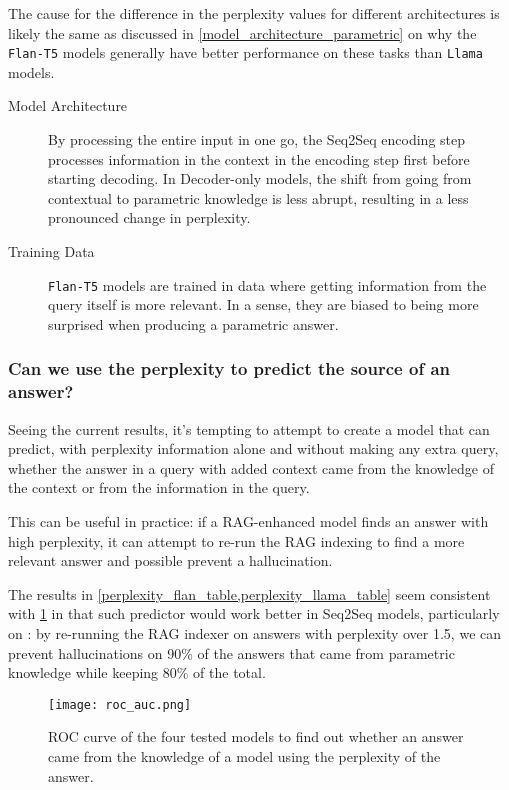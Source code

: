 The cause for the difference in the perplexity values for different architectures is likely the same as discussed in \cref{model_architecture_parametric} on why the \texttt{Flan-T5} models generally have better performance on these tasks than \texttt{Llama} models.
\begin{description}
	\item[Model Architecture] By processing the entire input in one go, the Seq2Seq encoding step processes information in the context in the encoding step first before starting decoding. In Decoder-only models, the shift from going from contextual to parametric knowledge is less abrupt, resulting in a less pronounced change in perplexity.
	\item[Training Data] \texttt{Flan-T5} models are trained in data where getting information from the query itself is more relevant.
		In a sense, they are biased to being more surprised when producing a parametric answer.
\end{description}

\subsubsection{Can we use the perplexity to predict the source of an answer?}

Seeing the current results, it's tempting to attempt to create a model that can predict, with perplexity information alone and without making any extra query, whether the answer in a query with added context came from the \Parametric{} knowledge of the context or from the \Contextual{} information in the query.

This can be useful in practice: if a RAG-enhanced model finds an answer with high perplexity, it can attempt to re-run the RAG indexing to find a more relevant answer and possible prevent a hallucination.

The results in \cref{perplexity_flan_table,perplexity_llama_table} seem consistent with \cref{roc_auc} in that such predictor would work better in Seq2Seq models, particularly on \bigflan{}: by re-running the RAG indexer on answers with perplexity over 1.5, we can prevent hallucinations on 90\% of the answers that came from parametric knowledge while keeping 80\% of the total.

\begin{figure}[hb]
	\centering
	\texttt{[image: roc\_auc.png]}
	\caption{ROC curve of the four tested models to find out whether an answer came from the \Paramtric{} knowledge of a model using the perplexity of the answer.}
	\label{roc_auc}
\end{figure}
